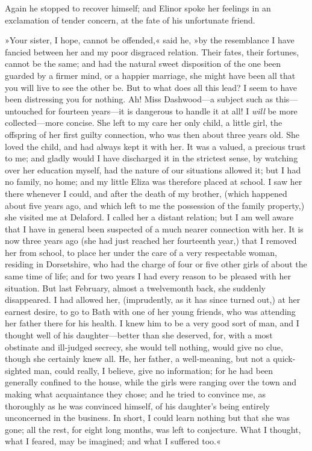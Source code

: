 Again he stopped to recover himself; and Elinor spoke her feelings in an exclamation of tender concern, at the fate of his unfortunate friend.

»Your sister, I hope, cannot be offended,« said he, »by the resemblance I have fancied between her and my poor disgraced relation. Their fates, their fortunes, cannot be the same; and had the natural sweet disposition of the one been guarded by a firmer mind, or a happier marriage, she might have been all that you will live to see the other be. But to what does all this lead? I seem to have been distressing you for nothing. Ah! Miss Dashwood—a subject such as this—untouched for fourteen years—it is dangerous to handle it at all! I \textit{will} be more collected—more concise. She left to my care her only child, a little girl, the offspring of her first guilty connection, who was then about three years old. She loved the child, and had always kept it with her. It was a valued, a precious trust to me; and gladly would I have discharged it in the strictest sense, by watching over her education myself, had the nature of our situations allowed it; but I had no family, no home; and my little Eliza was therefore placed at school. I saw her there whenever I could, and after the death of my brother, (which happened about five years ago, and which left to me the possession of the family property,) she visited me at Delaford. I called her a distant relation; but I am well aware that I have in general been suspected of a much nearer connection with her. It is now three years ago (she had just reached her fourteenth year,) that I removed her from school, to place her under the care of a very respectable woman, residing in Dorsetshire, who had the charge of four or five other girls of about the same time of life; and for two years I had every reason to be pleased with her situation. But last February, almost a twelvemonth back, she suddenly disappeared. I had allowed her, (imprudently, as it has since turned out,) at her earnest desire, to go to Bath with one of her young friends, who was attending her father there for his health. I knew him to be a very good sort of man, and I thought well of his daughter—better than she deserved, for, with a most obstinate and ill-judged secrecy, she would tell nothing, would give no clue, though she certainly knew all. He, her father, a well-meaning, but not a quick-sighted man, could really, I believe, give no information; for he had been generally confined to the house, while the girls were ranging over the town and making what acquaintance they chose; and he tried to convince me, as thoroughly as he was convinced himself, of his daughter’s being entirely unconcerned in the business. In short, I could learn nothing but that she was gone; all the rest, for eight long months, was left to conjecture. What I thought, what I feared, may be imagined; and what I suffered too.«

